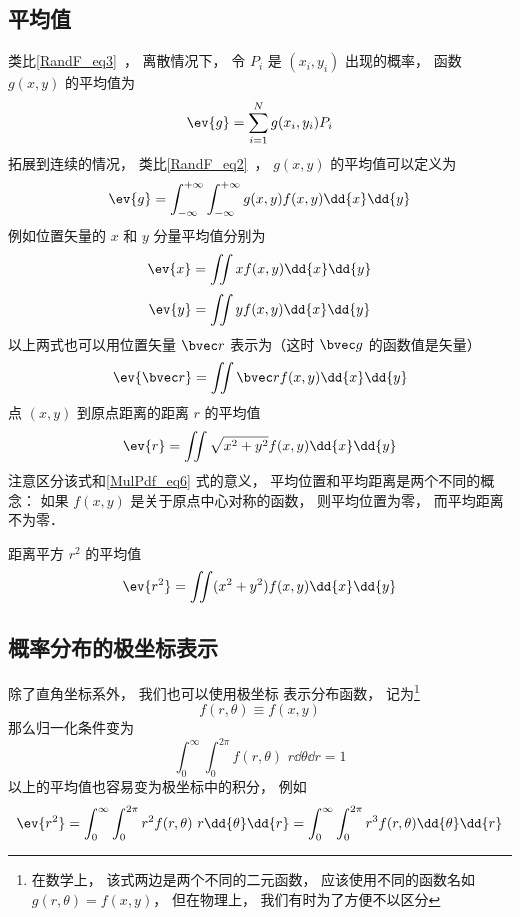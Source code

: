 \subsection{平均值}
类比\autoref{RandF_eq3}~， 离散情况下， 令 $P_i$ 是 $(x_i, y_i)$ 出现的概率， 函数 $g(x,y)$ 的平均值为
\begin{equation}
\ev{g} = \sum_{i=1}^N g(x_i, y_i) P_i
\end{equation}
拓展到连续的情况， 类比\autoref{RandF_eq2}~， $g(x, y)$ 的平均值可以定义为
\begin{equation}
\ev{g} =  \int_{-\infty}^{+\infty} \int_{-\infty}^{+\infty} g(x, y) f(x, y) \dd{x} \dd{y}
\end{equation}
例如位置矢量的 $x$ 和 $y$ 分量平均值分别为
\begin{equation}\label{MulPdf_eq2}
\ev{x} = \iint x f(x, y) \dd{x}\dd{y}
\end{equation}
\begin{equation}
\ev{y} = \iint y f(x, y) \dd{x}\dd{y}
\end{equation}
以上两式也可以用位置矢量 $\bvec r$ 表示为（这时 $\bvec g$ 的函数值是矢量）
\begin{equation}\label{MulPdf_eq6}
\ev{\bvec r} = \iint \bvec r f(x, y) \dd{x}\dd{y}
\end{equation}
点 $(x,y)$ 到原点距离的距离 $r$ 的平均值
\begin{equation}
\ev{r} = \iint \sqrt{x^2 + y^2} f(x, y) \dd{x}\dd{y}
\end{equation}
注意区分该式和\autoref{MulPdf_eq6} 式的意义， 平均位置和平均距离是两个不同的概念： 如果 $f(x, y)$ 是关于原点中心对称的函数， 则平均位置为零， 而平均距离不为零．

距离平方 $r^2$ 的平均值
\begin{equation}
\ev{r^2} = \iint (x^2 + y^2) f(x, y) \dd{x}\dd{y}
\end{equation}

\subsection{概率分布的极坐标表示}

除了直角坐标系外， 我们也可以使用极坐标 表示分布函数， 记为\footnote{在数学上， 该式两边是两个不同的二元函数， 应该使用不同的函数名如 $g(r, \theta) = f(x, y)$， 但在物理上， 我们有时为了方便不以区分}
\begin{equation}
f(r, \theta) \equiv f(x, y)
\end{equation}
那么归一化条件变为
\begin{equation}\label{MulPdf_eq1}
\int_0^\infty \int_{0}^{2\pi} f(r, \theta)\,\, r\dd{\theta}\dd{r} = 1
\end{equation}
以上的平均值也容易变为极坐标中的积分， 例如
\begin{equation}\label{MulPdf_eq3}
\ev{r^2} = \int_0^\infty \int_{0}^{2\pi} r^2 f(r, \theta)\,\, r\dd{\theta}\dd{r}
= \int_0^\infty \int_{0}^{2\pi} r^3 f(r, \theta) \dd{\theta}\dd{r}
\end{equation}

